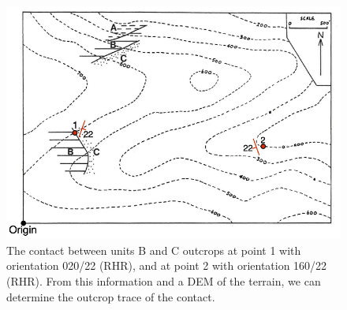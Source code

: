 \documentclass[a4paper , 12pt]{book}
\begin{document}
 \begin{figure}[t]
    \centering
    \includegraphics[width=11.8cm]{ch5f5.pdf}
    \caption{The contact between units B and C outcrops at point 1 with orientation 020/22 (RHR), and at point 2 with orientation 160/22 (RHR). From this information and a DEM of the terrain, we can determine the outcrop trace of the contact.}
\end{figure}
\end{document}
